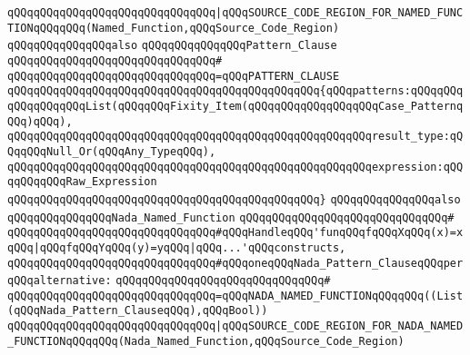 \verb|qQQqqQQqqQQqqQQqqQQqqQQqqQQqqQQq|\verb#|qQQqSOURCE_CODE_REGION_FOR_NAMED_FUNCTIONqQQqqQQq(Named_Function,qQQqSource_Code_Region)#\newline
\newline
\newline
\newline
\verb|qQQqqQQqqQQqqQQqalso|\newline
\verb|qQQqqQQqqQQqqQQqPattern_Clause|\newline
\verb|qQQqqQQqqQQqqQQqqQQqqQQqqQQqqQQq#|\newline
\verb|qQQqqQQqqQQqqQQqqQQqqQQqqQQqqQQq=qQQqPATTERN_CLAUSE|\newline
\verb|qQQqqQQqqQQqqQQqqQQqqQQqqQQqqQQqqQQqqQQqqQQqqQQq{qQQqpatterns:qQQqqQQqqQQqqQQqqQQqList(qQQqqQQqFixity_Item(qQQqqQQqqQQqqQQqqQQqCase_PatternqQQq)qQQq),|\newline
\verb|qQQqqQQqqQQqqQQqqQQqqQQqqQQqqQQqqQQqqQQqqQQqqQQqqQQqqQQqresult_type:qQQqqQQqNull_Or(qQQqAny_TypeqQQq),|\newline
\verb|qQQqqQQqqQQqqQQqqQQqqQQqqQQqqQQqqQQqqQQqqQQqqQQqqQQqqQQqexpression:qQQqqQQqqQQqRaw_Expression|\newline
\verb|qQQqqQQqqQQqqQQqqQQqqQQqqQQqqQQqqQQqqQQqqQQqqQQq}|\newline
\newline
\newline
\verb|qQQqqQQqqQQqqQQqalso|\newline
\verb|qQQqqQQqqQQqqQQqNada_Named_Function|\newline
\verb|qQQqqQQqqQQqqQQqqQQqqQQqqQQqqQQq#|\newline
\verb|qQQqqQQqqQQqqQQqqQQqqQQqqQQqqQQq#qQQqHandleqQQq'funqQQqfqQQqXqQQq(x)=xqQQq|\verb#|qQQqfqQQqYqQQq(y)=yqQQq|qQQq...'qQQqconstructs,#\newline
\verb|qQQqqQQqqQQqqQQqqQQqqQQqqQQqqQQq#qQQqoneqQQqNada_Pattern_ClauseqQQqperqQQqalternative:|\newline
\verb|qQQqqQQqqQQqqQQqqQQqqQQqqQQqqQQq#|\newline
\verb|qQQqqQQqqQQqqQQqqQQqqQQqqQQqqQQq=qQQqNADA_NAMED_FUNCTIONqQQqqQQq((List(qQQqNada_Pattern_ClauseqQQq),qQQqBool))|\newline
\newline
\verb|qQQqqQQqqQQqqQQqqQQqqQQqqQQqqQQq|\verb#|qQQqSOURCE_CODE_REGION_FOR_NADA_NAMED_FUNCTIONqQQqqQQq(Nada_Named_Function,qQQqSource_Code_Region)#\newline
\newline
\newline
\newline
